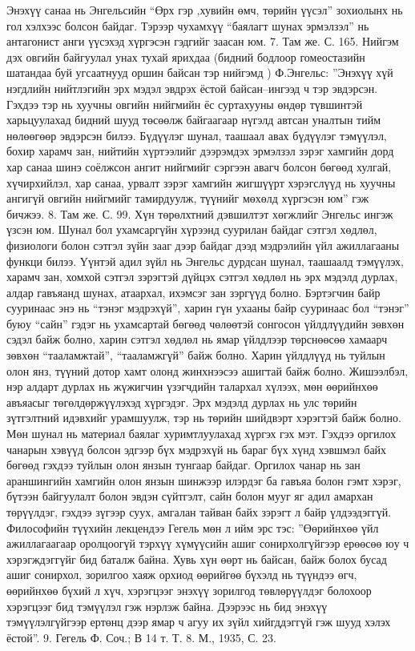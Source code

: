 Энэхүү санаа нь Энгельсийн “Өрх гэр ,хувийн өмч, төрийн үүсэл” зохиолынх нь гол хэлхээс болсон байдаг. Тэрээр чухамхүү “баялагт шунах эрмэлзэл” нь антагонист анги үүсэхэд хүргэсэн гэдгийг заасан юм. 7. Там же. С. 165.
Нийгэм дэх овгийн байгуулал унах тухай ярихдаа (бидний бодлоор гомеостазийн шатандаа буй угсаатнууд оршин байсан тэр нийгэмд ) Ф.Энгельс: ”Энэхүү хүй нэгдлийн нийтлэгийн эрх мэдэл эвдрэх ёстой байсан–ингээд ч тэр эвдэрсэн. Гэхдээ тэр нь хуучны овгийн нийгмийн ёс суртахууны өндөр түвшинтэй харьцуулахад бидний шууд төсөөлж байгаагаар нүгэлд автсан уналтын тийм нөлөөгөөр эвдэрсэн билээ. Бүдүүлэг шунал, таашаал авах бүдүүлэг тэмүүлэл, бохир харамч зан, нийтийн хүртээлийг дээрэмдэх эрмэлзэл зэрэг хамгийн дорд хар санаа шинэ соёлжсон ангит нийгмийг сэргээн авагч болсон бөгөөд хулгай, хүчирхийлэл, хар санаа, урвалт зэрэг хамгийн жигшүүрт хэрэгслүүд нь хуучны ангигүй овгийн нийгмийг тамирдуулж, түүнийг мөхөлд хүргэсэн юм” гэж бичжээ. 8. Там же. С. 99.
Хүн төрөлхтний дэвшилтэт хөгжлийг Энгельс ингэж үзсэн юм. Шунал бол ухамсаргүйн хүрээнд суурилан байдаг сэтгэл хөдлөл, физиологи болон сэтгэл зүйн зааг дээр байдаг дээд мэдрэлийн үйл ажиллагааны функци билээ. Үүнтэй адил зүйл нь Энгельс дурдсан шунал, таашаалд тэмүүлэх, харамч зан, хомхой сэтгэл зэрэгтэй дүйцэх сэтгэл хөдлөл нь эрх мэдэлд дурлах, алдар гавъяанд шунах, атаархал, ихэмсэг зан зэргүүд болно. Бэртэгчин байр сууринаас энэ нь “тэнэг мэдрэхүй”, харин гүн ухааны байр сууринаас бол “тэнэг” буюу “сайн” гэдэг нь ухамсартай бөгөөд чөлөөтэй сонгосон үйлдлүүдийн зөвхөн сэдэл байж болно, харин сэтгэл хөдлөл нь ямар үйлдлээр төрснөөсөө хамаарч зөвхөн “тааламжтай”, “тааламжгүй” байж болно. Харин үйлдлүүд нь туйлын олон янз, түүний дотор хамт олонд жинхнээсээ ашигтай байж болно. Жишээлбэл, нэр алдарт дурлах нь жүжигчин үзэгчдийн талархал хүлээх, мөн өөрийнхөө авъяасыг төгөлдөржүүлэхэд хүргэдэг. Эрх мэдэлд дурлах нь улс төрийн зүтгэлтний идэвхийг урамшуулж, тэр нь төрийн шийдвэрт хэрэгтэй байж болно. Мөн шунал нь материал баялаг хуримтлуулахад хүргэх гэх мэт. Гэхдээ оргилох чанарын хэвүүд болсон эдгээр бүх мэдрэхүй нь бараг бүх хүнд хэвшмэл байх бөгөөд гэхдээ туйлын олон янзын тунгаар байдаг. Оргилох чанар нь зан араншингийн хамгийн олон янзын шинжээр илэрдэг ба гавъяа болон гэмт хэрэг, бүтээн байгуулалт болон эвдэн сүйтгэлт, сайн болон мууг яг адил амархан төрүүлдэг, гэхдээ зүгээр суух, амгалан тайван байх зэрэгт л байр үлдээдэггүй.
Философийн түүхийн лекцендээ Гегель мөн л ийм эрс тэс: ”Өөрийнхөө үйл ажиллагаагаар оролцоогүй тэрхүү хүмүүсийн ашиг сонирхолгүйгээр ерөөсөө юу ч хэрэгждэггүйг бид баталж байна. Хувь хүн өөрт нь байсан, байж болох бусад ашиг сонирхол, зорилгоо хаяж орхиод өөрийгөө бүхэлд нь түүндээ өгч, өөрийнхөө бүхий л хүч, хэрэгцээг энэхүү зорилгод төвлөрүүлдэг болохоор хэрэгцээг бид тэмүүлэл гэж нэрлэж байна. Дээрээс нь бид энэхүү тэмүүлэлгүйгээр ертөнц дээр ямар ч агуу их зүйл хийгддэггүй гэж шууд хэлэх ёстой”. 9. Гегель Ф. Соч.; В 14 т. Т. 8. М., 1935, С. 23.

